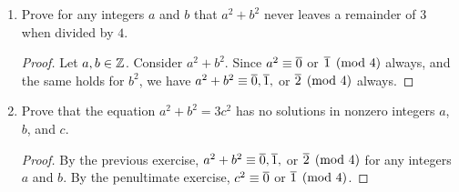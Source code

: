\begin{enumerate}
	\newpage
	\item Prove for any integers $a$ and $b$ that $a^2+b^2$ never leaves a remainder of $3$ when divided by $4$.
	\begin{proof}
		Let $a,b\in \mathbb{Z}$.  Consider $a^2+b^2$.  Since $a^2\equiv \overline{0}$ or $\overline{1}\pmod 4$ always, and the same holds for $b^2$, we have $a^2 + b^2 \equiv \overline{0}, \overline{1},$ or $\overline{2}\pmod 4$ always. 
	\end{proof}
	\item Prove that the equation $a^2+b^2 = 3c^2$ has no solutions in nonzero integers $a$, $b$, and $c$.
	\begin{proof}
		By the previous exercise, $a^2+b^2 \equiv \overline{0}, \overline{1},$ or $\overline{2}\pmod 4$ for any integers $a$ and $b$.  By the penultimate exercise, $c^2 \equiv \overline{0}$ or $\overline{1} \pmod 4$.
		

\end{proof}
\end{enumerate}
